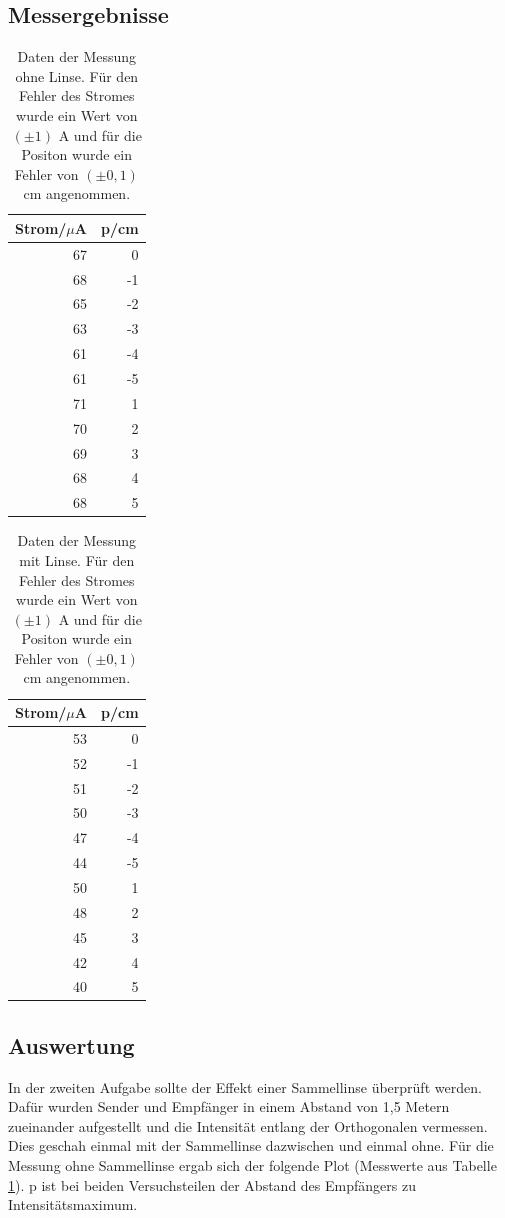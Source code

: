 \documentclass[12pt]{scrartcl}
\begin{document}
\subsection{Messergebnisse}
\begin{table}[H]
\caption{Daten der Messung ohne Linse. Für den Fehler des Stromes wurde ein Wert von $(\pm 1)$ A und für die Positon wurde ein Fehler von $(\pm 0,1)$ cm angenommen.}
\centering
\begin{tabular}{|r|r|}
\hline
\multicolumn{1}{|l|}{Strom/$\mu$A} & \multicolumn{1}{l|}{p/cm} \\ \hline
67 & 0 \\ \hline
68 & -1 \\ \hline
65 & -2 \\ \hline
63 & -3 \\ \hline
61 & -4 \\ \hline
61 & -5 \\ \hline
71 & 1 \\ \hline
70 & 2 \\ \hline
69 & 3 \\ \hline
68 & 4 \\ \hline
68 & 5 \\ \hline
\end{tabular}
\label{tab:a_2_o}
\end{table}

\begin{table}[H]
\caption{Daten der Messung mit Linse. Für den Fehler des Stromes wurde ein Wert von $(\pm 1)$ A und für die Positon wurde ein Fehler von $(\pm 0,1)$ cm angenommen.}
\centering
\begin{tabular}{|r|r|}
\hline
\multicolumn{1}{|l|}{Strom/$\mu$A} & \multicolumn{1}{l|}{p/cm} \\ \hline
53 & 0 \\ \hline
52 & -1 \\ \hline
51 & -2 \\ \hline
50 & -3 \\ \hline
47 & -4 \\ \hline
44 & -5 \\ \hline
50 & 1 \\ \hline
48 & 2 \\ \hline
45 & 3 \\ \hline
42 & 4 \\ \hline
40 & 5 \\ \hline
\end{tabular}
\label{tab:a_2_m}
\end{table}
\subsection{Auswertung}
In der zweiten Aufgabe sollte der Effekt einer Sammellinse überprüft werden.
Dafür wurden Sender und Empfänger in einem Abstand von 1,5 Metern zueinander aufgestellt und die Intensität entlang der Orthogonalen vermessen. Dies geschah einmal mit der Sammellinse dazwischen und einmal ohne. Für die Messung ohne Sammellinse ergab sich der folgende Plot (Messwerte aus Tabelle \ref{tab:a_2_o}). p ist  bei beiden Versuchsteilen der Abstand des Empfängers zu Intensitätsmaximum.
\end{document}
